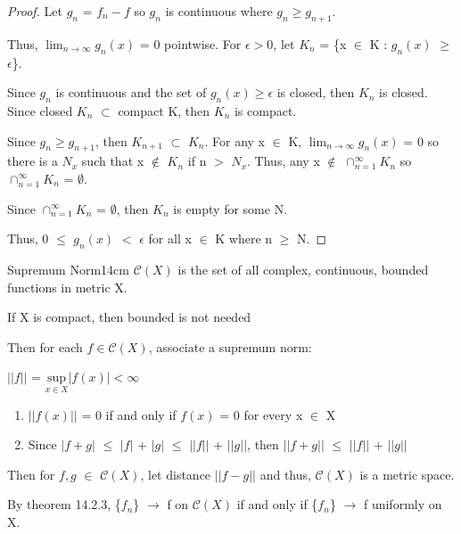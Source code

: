     \begin{proof}
        Let $g_n$ = $f_n - f$ so $g_n$ is continuous where $g_n \geq g_{n+1}$.

        Thus, $\lim_{n \rightarrow \infty} g_n(x)$ = 0 pointwise.
        For $\epsilon > 0$, let $K_n$ = \{x $\in$ K : $g_n(x)$ $\geq$ $\epsilon$\}.

        Since $g_n$ is continuous and the set of $g_n(x) \geq \epsilon$ is closed,
        then $K_n$ is closed. Since closed $K_n$ $\subset$ compact K, then $K_n$
        is compact.

        Since $g_n \geq g_{n+1}$, then $K_{n+1}$ $\subset$ $K_n$.
        For any x $\in$ K, $\lim_{n \rightarrow \infty} g_n(x)$ = 0 so
        there is a $N_x$ such that x $\not \in$ $K_n$ if n $>$ $N_x$.
        Thus, any x $\not \in$ $\cap_{n=1}^{\infty} K_n$ so
        $\cap_{n=1}^{\infty} K_n$ = $\emptyset$.
        
        Since $\cap_{n=1}^{\infty} K_n$ = $\emptyset$, then $K_n$ is empty for some N.

        Thus, 0 $\leq$ $g_n(x)$ $<$ $\epsilon$ for all x $\in$ K where n $\geq$ N.
    \end{proof}

    \vspace{0.5cm}



    \begin{definition}{Supremum Norm}{14cm}
        $\mathscr{C}(X)$ is the set of all
        complex, continuous, bounded functions in metric X.
        
        \hspace{0.5cm}
        If X is compact, then bounded is not needed

        Then for each $f \in \mathscr{C}(X)$, associate a supremum norm:

        \hspace{0.5cm}
        $|| f ||$ = $\underset{x \in X}{\text{sup}} |f(x)| < \infty$

        \begin{enumerate}[label=(\alph*), leftmargin=1cm, itemsep=0.1cm]
            \item $|| f(x) ||$ = 0 if and only if $f(x)$ = 0 for every x $\in$ X
            
            \item Since $|f+g|$ $\leq$ $|f|$ + $|g|$ $\leq$ $||f||$ + $||g||$,
            then $||f+g||$ $\leq$ $||f||$ + $||g||$
        \end{enumerate}

        Then for $f,g$ $\in$ $\mathscr{C}(X)$, let distance $||f-g||$
        and thus, $\mathscr{C}(X)$ is a metric space.

        \vspace{0.3cm}

        By {\color{red} theorem 14.2.3},
        \{$f_n$\} $\rightarrow$ f on $\mathscr{C}(X)$ if
        and only if \{$f_n$\} $\rightarrow$ f uniformly on X.
    \end{definition}

